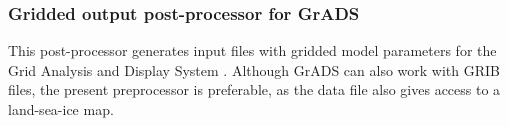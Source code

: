 \vsssub
\subsubsection{Gridded output post-processor for GrADS} \label{sec:gxoutf}
\vsssub



\vspace{\baselineskip} 
\noindent 
This post-processor generates input files with gridded model parameters for
the Grid Analysis and Display System \citep[GrADS,][]{man:GrADS}. 
Although GrADS can also work with GRIB files, the present preprocessor is preferable,
as the data file also gives access to a land-sea-ice map.

\pb